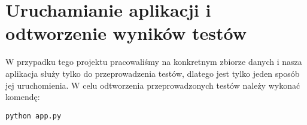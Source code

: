 \section{Uruchamianie aplikacji i odtworzenie wyników testów}
W przypadku tego projektu pracowaliśmy na konkretnym zbiorze danych i nasza aplikacja służy tylko do przeprowadzenia testów, dlatego jest tylko jeden sposób jej uruchomienia.
W celu odtworzenia przeprowadzonych testów należy wykonać komendę:
\begin{verbatim}
python app.py
\end{verbatim}